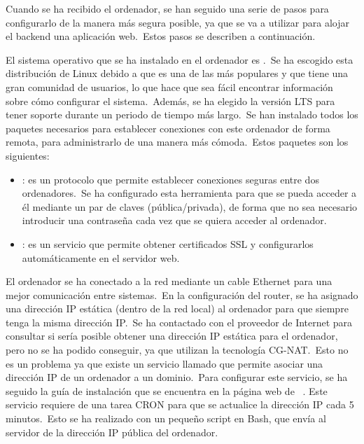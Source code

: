 Cuando se ha recibido el ordenador, se han seguido una serie de pasos para configurarlo de la manera más segura posible,
ya que se va a utilizar para alojar el backend una aplicación web.\ Estos pasos se describen a continuación.

El sistema operativo que se ha instalado en el ordenador es .\ Se ha escogido esta
distribución de Linux debido a que es una de las más populares y que tiene una gran comunidad de usuarios, lo que
hace que sea fácil encontrar información sobre cómo configurar el sistema.\ Además, se ha elegido la versión LTS para
tener soporte durante un periodo de tiempo más largo.\ Se han instalado todos los paquetes necesarios para
establecer conexiones con este ordenador de forma remota, para administrarlo de una manera más cómoda.\ Estos paquetes
son los siguientes:
\begin{itemize}
	\item {}:  es un protocolo que permite establecer conexiones seguras entre dos
	ordenadores.\ Se ha
	configurado esta herramienta para que se pueda acceder a él mediante un par de claves (pública/privada), de forma
	que no sea
	necesario introducir una contraseña cada vez que se quiera acceder al ordenador.
	\item {}: es un servicio que permite obtener certificados SSL y configurarlos automáticamente en el
	servidor web.
\end{itemize}
\label{itm:os_packages}

El ordenador se ha conectado a la red mediante un cable Ethernet para una mejor comunicación entre sistemas.\
En la configuración del router, se ha asignado una dirección IP estática (dentro de la red local) al
ordenador para que siempre tenga la misma dirección IP.\ Se ha contactado con el proveedor de Internet para consultar
si sería posible obtener una dirección IP estática para el ordenador, pero no se ha podido conseguir, ya que
utilizan la tecnología CG-NAT.\ Esto no es un problema ya que existe un servicio llamado \boldFont{DuckDNS} que permite
asociar una dirección IP de un ordenador a un dominio.\ Para configurar este servicio, se ha seguido la guía de
instalación que se encuentra en la página web de \boldFont{DuckDNS}~\cite{DuckDNSi96:online}.
Este servicio requiere de una tarea CRON para que se actualice la dirección IP cada 5 minutos.\ Esto se ha realizado con
un pequeño script en Bash, que envía al servidor de \boldFont{DuckDNS} la dirección IP pública del ordenador.

